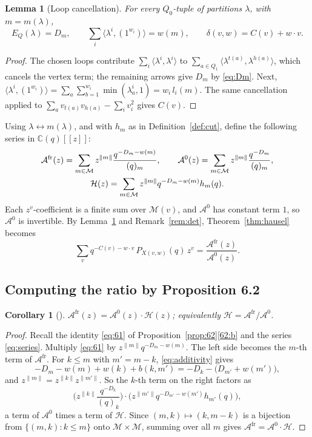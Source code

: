\documentclass[11pt]{amsart}
\newtheorem{lemma}[theorem]{Lemma}
\newtheorem{corollary}[theorem]{Corollary}
\theoremstyle{definition}
\theoremstyle{remark}
\numberwithin{equation}{section}
\newcommand{\C}{\mathbb{C}}
\newcommand{\cM}{\mathcal{M}}
\newcommand{\cH}{\mathcal{H}}
\newcommand{\Afr}{\mathcal{A}^{\mathrm{fr}}}
\newcommand{\Aun}{\mathcal{A}^{0}}
\newcommand{\norm}[1]{\lVert #1\rVert}
\begin{document}
\begin{lemma}[Loop cancellation]\label{lem:loops}
For every $Q_0$-tuple of partitions $\lambda$, with $m=m(\lambda)$,
\[
  E_Q(\lambda)=D_m,\qquad \sum_i\langle\lambda^i,(1^{w_i})\rangle=w(m),\qquad \delta(v,w)=C(v)+w\cdot v .
\]
\end{lemma}

\begin{proof}
The chosen loops contribute $\sum_i\langle\lambda^i,\lambda^i\rangle$ to
$\sum_{a\in Q_1}\langle\lambda^{t(a)},\lambda^{h(a)}\rangle$, which cancels the vertex term; the remaining
arrows give $D_m$ by \eqref{eq:Dm}. Next, $\langle\lambda^i,(1^{w_i})\rangle=\sum_a\sum_{b=1}^{w_i}
\min(\lambda^i_a,1)=w_i\,l_i(m)$. The same cancellation applied to $\sum_av_{t(a)}v_{h(a)}-\sum_iv_i^2$
gives $C(v)$.
\end{proof}

Using $\lambda\leftrightarrow m(\lambda)$, and with $h_m$ as in Definition~\ref{def:cut}, define the
following series in $\C(q)[[z]]$:
\begin{gather}
  \Afr(z)=\sum_{m\in\cM}z^{\norm{m}}\frac{q^{-D_m-w(m)}}{(q)_m},\qquad
  \Aun(z)=\sum_{m\in\cM}z^{\norm{m}}\frac{q^{-D_m}}{(q)_m},\label{eq:series}\\
  \cH(z)=\sum_{m\in\cM}z^{\norm{m}}q^{-D_m-w(m)}h_m(q).\notag
\end{gather}
Each $z^v$-coefficient is a finite sum over $\cM(v)$, and $\Aun$ has constant term $1$, so $\Aun$ is
invertible. By Lemma~\ref{lem:loops} and Remark~\ref{rem:det}, Theorem~\ref{thm:hausel} becomes
\begin{equation}\label{eq:hausel-loop}
  \sum_vq^{-C(v)-w\cdot v}\,P_{X(v,w)}(q)\,z^v=\frac{\Afr(z)}{\Aun(z)}.
\end{equation}

\subsection{Computing the ratio by Proposition 6.2}

\begin{corollary}[{\cite[Corollary~6.3]{Hik}}]\label{cor:63}
$\Afr(z)=\Aun(z)\cdot\cH(z)$; equivalently $\cH=\Afr/\Aun$.
\end{corollary}

\begin{proof}
Recall the identity \eqref{eq:61} of Proposition~\ref{prop:62}\ref{62:b} and the series
\eqref{eq:series}. Multiply \eqref{eq:61} by $z^{\norm{m}}q^{-D_m-w(m)}$. The left side becomes the
$m$-th term of $\Afr$.
For $k\le m$ with $m'=m-k$, \eqref{eq:additivity} gives
\[
  -D_m-w(m)+w(k)+b(k,m')=-D_k-\big(D_{m'}+w(m')\big),
\]
and $z^{\norm{m}}=z^{\norm{k}}z^{\norm{m'}}$. So the $k$-th term on the right factors as
\[
  \Big(z^{\norm{k}}\frac{q^{-D_k}}{(q)_k}\Big)\cdot\Big(z^{\norm{m'}}q^{-D_{m'}-w(m')}h_{m'}(q)\Big),
\]
a term of $\Aun$ times a term of $\cH$. Since $(m,k)\mapsto(k,m-k)$ is a bijection from
$\{(m,k):k\le m\}$ onto $\cM\times\cM$, summing over all $m$ gives $\Afr=\Aun\cdot\cH$.
\end{proof}
\end{document}
